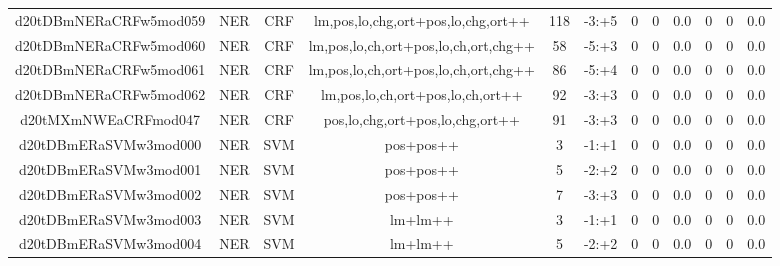 \documentclass[a4paper]{article}
\begin{document}
\begin{landscape}
\begin{center}
\begin{tabular}{ |c|c|c|c|c|c|c|c|c|c|c|c|}
 
 	
 	\small{ d20tDBmNERaCRFw5mod059 } & \small{ NER} & \small{  CRF }  & lm,pos,lo,chg,ort+pos,lo,chg,ort++  &  118 &  \small{  -3:+5 }  &  0 & 0 & 0.0  &  0 & 0 & 0.0 \\
 	

 
 	
 	\small{ d20tDBmNERaCRFw5mod060 } & \small{ NER} & \small{  CRF }  & lm,pos,lo,ch,ort+pos,lo,ch,ort,chg++  &  58 &  \small{  -5:+3 }  &  0 & 0 & 0.0  &  0 & 0 & 0.0 \\
 	

 
 	
 	\small{ d20tDBmNERaCRFw5mod061 } & \small{ NER} & \small{  CRF }  & lm,pos,lo,ch,ort+pos,lo,ch,ort,chg++  &  86 &  \small{  -5:+4 }  &  0 & 0 & 0.0  &  0 & 0 & 0.0 \\
 	

 
 	
 	\small{ d20tDBmNERaCRFw5mod062 } & \small{ NER} & \small{  CRF }  & lm,pos,lo,ch,ort+pos,lo,ch,ort++  &  92 &  \small{  -3:+3 }  &  0 & 0 & 0.0  &  0 & 0 & 0.0 \\
 	

 
 	
 	\small{ d20tMXmNWEaCRFmod047 } & \small{ NER} & \small{  CRF }  & pos,lo,chg,ort+pos,lo,chg,ort++  &  91 &  \small{  -3:+3 }  &  0 & 0 & 0.0  &  0 & 0 & 0.0 \\
 	

 
 	
 	\small{ d20tDBmERaSVMw3mod000 } & \small{ NER} & \small{  SVM }  & pos+pos++  &  3 &  \small{  -1:+1 }  &  0 & 0 & 0.0  &  0 & 0 & 0.0 \\
 	

 
 	
 	\small{ d20tDBmERaSVMw3mod001 } & \small{ NER} & \small{  SVM }  & pos+pos++  &  5 &  \small{  -2:+2 }  &  0 & 0 & 0.0  &  0 & 0 & 0.0 \\
 	

 
 	
 	\small{ d20tDBmERaSVMw3mod002 } & \small{ NER} & \small{  SVM }  & pos+pos++  &  7 &  \small{  -3:+3 }  &  0 & 0 & 0.0  &  0 & 0 & 0.0 \\
 	

 
 	
 	\small{ d20tDBmERaSVMw3mod003 } & \small{ NER} & \small{  SVM }  & lm+lm++  &  3 &  \small{  -1:+1 }  &  0 & 0 & 0.0  &  0 & 0 & 0.0 \\
 	

 
 	
 	\small{ d20tDBmERaSVMw3mod004 } & \small{ NER} & \small{  SVM }  & lm+lm++  &  5 &  \small{  -2:+2 }  &  0 & 0 & 0.0  &  0 & 0 & 0.0 \\
 	


\end{tabular}
\end{center}
\end{landscape}
\end{document}
